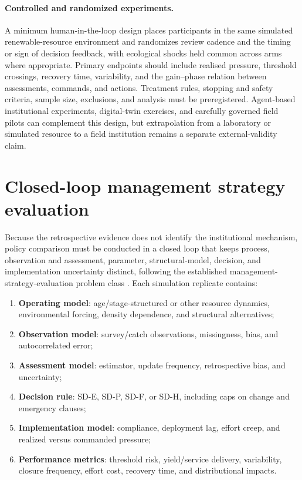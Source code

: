 \documentclass[11pt]{article}
\begin{document}
\paragraph{Controlled and randomized experiments.}
A minimum human-in-the-loop design places participants in the same simulated renewable-resource environment and randomizes review cadence and the timing or sign of decision feedback, with ecological shocks held common across arms where appropriate. Primary endpoints should include realised pressure, threshold crossings, recovery time, variability, and the gain--phase relation between assessments, commands, and actions. Treatment rules, stopping and safety criteria, sample size, exclusions, and analysis must be preregistered. Agent-based institutional experiments, digital-twin exercises, and carefully governed field pilots can complement this design, but extrapolation from a laboratory or simulated resource to a field institution remains a separate external-validity claim.

\section{Closed-loop management strategy evaluation}

Because the retrospective evidence does not identify the institutional mechanism, policy comparison must be conducted in a closed loop that keeps process, observation and assessment, parameter, structural-model, decision, and implementation uncertainty distinct, following the established management-strategy-evaluation problem class \cite{punt2016}. Each simulation replicate contains:

\begin{enumerate}
    \item \textbf{Operating model}: age/stage-structured or other resource dynamics, environmental forcing, density dependence, and structural alternatives;
    \item \textbf{Observation model}: survey/catch observations, missingness, bias, and autocorrelated error;
    \item \textbf{Assessment model}: estimator, update frequency, retrospective bias, and uncertainty;
    \item \textbf{Decision rule}: SD-E, SD-P, SD-F, or SD-H, including caps on change and emergency clauses;
    \item \textbf{Implementation model}: compliance, deployment lag, effort creep, and realized versus commanded pressure;
    \item \textbf{Performance metrics}: threshold risk, yield/service delivery, variability, closure frequency, effort cost, recovery time, and distributional impacts.
\end{enumerate}
\end{document}
